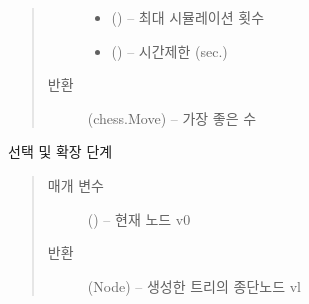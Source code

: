 \documentclass[letterpaper,10pt,english]{sphinxmanual}
\begin{document}
\begin{fulllineitems}
\begin{fulllineitems}
\begin{quote}
\begin{description}
\begin{itemize}
\item {} 
 () -- 최대 시뮬레이션 횟수

\item {} 
 () -- 시간제한 (sec.)

\end{itemize}

\item[{반환}] \leavevmode
(chess.Move) -- 가장 좋은 수

\end{description}\end{quote}

\end{fulllineitems}


\begin{fulllineitems}
\label{\detokenize{agents.search:agents.search.mcts_agent.MCTSPlanner.tree_policy}}
선택 및 확장 단계
\begin{quote}\begin{description}
\item[{매개 변수}] \leavevmode
{} () -- 현재 노드 v0

\item[{반환}] \leavevmode
(Node) -- 생성한 트리의 종단노드 vl

\end{description}\end{quote}

\end{fulllineitems}


\end{fulllineitems}

\end{document}
